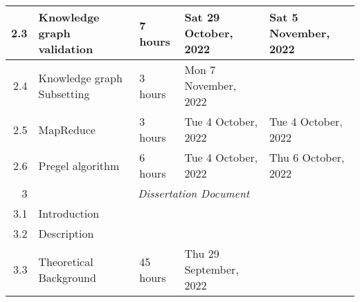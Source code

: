 \documentclass{standalone}
\begin{document}
\begin{tabular}{|r|llll|}
    2.3                                                       & \multicolumn{1}{l|}{Knowledge graph validation}                 & \multicolumn{1}{l|}{7 hours}                                   & \multicolumn{1}{l|}{Sat 29 October, 2022}                   & Sat 5 November, 2022                                         \\ \hline
    2.4                                                       & \multicolumn{1}{l|}{Knowledge graph Subsetting}                 & \multicolumn{1}{l|}{3 hours}                                   & \multicolumn{1}{l|}{Mon 7 November, 2022}                   &                                                              \\ \hline
    2.5                                                       & \multicolumn{1}{l|}{MapReduce}                                  & \multicolumn{1}{l|}{3 hours}                                   & \multicolumn{1}{l|}{Tue 4 October, 2022}                    & Tue 4 October, 2022                                          \\ \hline
    2.6                                                       & \multicolumn{1}{l|}{Pregel algorithm}                           & \multicolumn{1}{l|}{6 hours}                                   & \multicolumn{1}{l|}{Tue 4 October, 2022}                    & Thu 6 October, 2022                                          \\ \hline
    3                                                         & \multicolumn{4}{c|}{\textit{Dissertation Document}}                                                                                                                                                                                                           \\ \hline
    3.1                                                       & \multicolumn{1}{l|}{Introduction}                               & \multicolumn{1}{l|}{}                                          & \multicolumn{1}{l|}{}                                       &                                                              \\ \hline
    3.2                                                       & \multicolumn{1}{l|}{Description}                                & \multicolumn{1}{l|}{}                                          & \multicolumn{1}{l|}{}                                       &                                                              \\ \hline
    3.3                                                       & \multicolumn{1}{l|}{Theoretical Background}                     & \multicolumn{1}{l|}{45 hours}                                  & \multicolumn{1}{l|}{Thu 29 September, 2022}                 &                                                              \\ \hline

\end{tabular}
\end{document}
